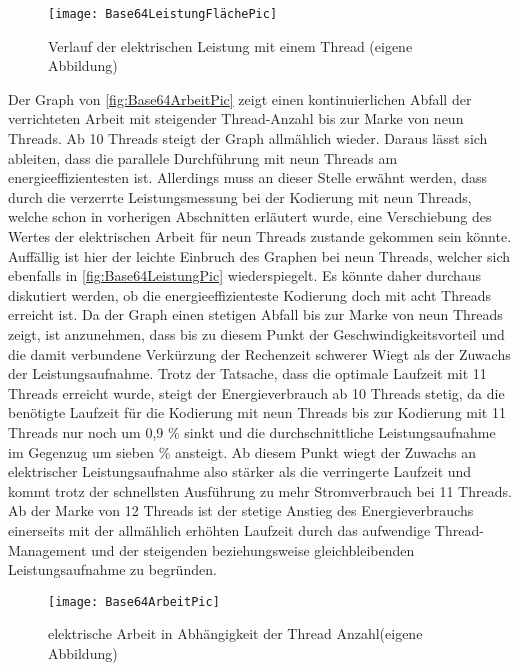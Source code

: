\begin{figure}[H]
	\begin{center}	 
	\texttt{[image: Base64LeistungFlächePic]}
	\caption{Verlauf der elektrischen Leistung mit einem Thread (eigene Abbildung)}
	\label{fig:Base64LeistungFlächePic} 
	\end{center}
\end{figure}


Der Graph von \autoref{fig:Base64ArbeitPic} zeigt einen kontinuierlichen Abfall der verrichteten Arbeit mit steigender Thread-Anzahl bis zur Marke von neun Threads. Ab 10 Threads steigt der Graph allmählich wieder. Daraus lässt sich ableiten, dass die parallele Durchführung mit neun Threads am energieeffizientesten ist. Allerdings muss an dieser Stelle erwähnt werden, dass durch die verzerrte Leistungsmessung bei der Kodierung mit neun Threads, welche schon in vorherigen Abschnitten erläutert wurde, eine Verschiebung des Wertes der elektrischen Arbeit für neun Threads zustande gekommen sein könnte. Auffällig ist hier der leichte Einbruch des Graphen bei neun Threads, welcher sich ebenfalls in \autoref{fig:Base64LeistungPic} wiederspiegelt. Es könnte daher durchaus diskutiert werden, ob die energieeffizienteste Kodierung doch mit acht Threads erreicht ist. Da der Graph einen stetigen Abfall bis zur Marke von neun Threads zeigt, ist anzunehmen, dass bis zu diesem Punkt der Geschwindigkeitsvorteil und die damit verbundene Verkürzung der Rechenzeit schwerer Wiegt als der Zuwachs der Leistungsaufnahme. Trotz der Tatsache, dass die optimale Laufzeit mit 11 Threads erreicht wurde, steigt der Energieverbrauch ab 10 Threads stetig, da die benötigte Laufzeit für die Kodierung mit neun Threads bis zur Kodierung mit 11 Threads nur noch um 0,9 \% sinkt und die durchschnittliche Leistungsaufnahme im Gegenzug um sieben \% ansteigt. Ab diesem Punkt wiegt der Zuwachs an elektrischer Leistungsaufnahme also stärker als die verringerte Laufzeit und kommt trotz der schnellsten Ausführung zu mehr Stromverbrauch bei 11 Threads. Ab der Marke von 12 Threads ist der stetige Anstieg des Energieverbrauchs einerseits mit der allmählich erhöhten Laufzeit durch das aufwendige Thread-Management und der steigenden beziehungsweise gleichbleibenden Leistungsaufnahme zu begründen.

\begin{figure}[H]
	\begin{center}	 
	\texttt{[image: Base64ArbeitPic]}
	\caption{elektrische Arbeit in Abhängigkeit der Thread Anzahl(eigene Abbildung)}
	\label{fig:Base64ArbeitPic} 
	\end{center}
\end{figure}

